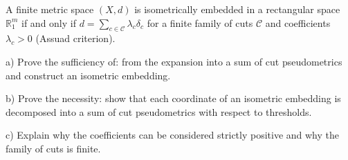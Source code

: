 \documentclass[a4paper,12pt]{report}
\begin{document}
\begin{task}
A finite metric space $(X,d)$ is isometrically embedded in a rectangular space $\mathbb R^m_1$ if and only if $d=\sum_{c\in\mathcal C}\lambda_c\delta_c$ for a finite family of cuts $\mathcal C$ and coefficients $\lambda_c>0$ (Assuad criterion).

\textup{a)} Prove the sufficiency of\textup{:} from the expansion into a sum of cut pseudometrics and construct an isometric embedding.

\textup{b)} Prove the necessity\textup{:} show that each coordinate of an isometric embedding is decomposed into a sum of cut pseudometrics with respect to thresholds.

\textup{c)} Explain why the coefficients can be considered strictly positive and why the family of cuts is finite.

\end{task}
\end{document}
